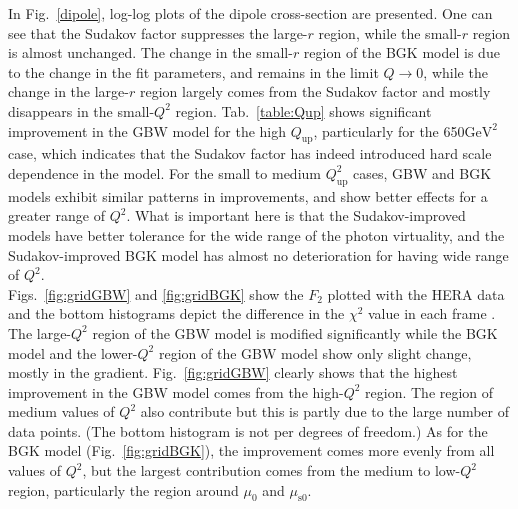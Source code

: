 \documentclass[11pt]{article}
\begin{document}
In Fig.~\ref{dipole}, log-log plots of the dipole cross-section are presented. One can see that the Sudakov factor suppresses the large-$r$ region, while the small-$r$ region is almost unchanged. The change in the small-$r$ region of the BGK model is due to the change in the fit parameters, and remains in the limit $Q\rightarrow0$, while the change in the large-$r$ region largely comes from the Sudakov factor and mostly disappears in the small-$Q^2$ region. 
Tab.~\ref{table:Qup} shows significant improvement in the GBW model for the high $Q_{\mathrm{up}}$, particularly for the 650$\mathrm{GeV^2}$ case, which indicates that the Sudakov factor has indeed introduced hard scale dependence in the model. For the small to medium $Q^2_{\mathrm{up}}$ cases, GBW and BGK models exhibit similar patterns in improvements, and show better effects for a greater range of $Q^2$.
What is important here is that the Sudakov-improved models have better tolerance for the wide range of the photon virtuality, and the Sudakov-improved BGK model has almost no deterioration for having wide range of $Q^2$.\\
Figs.~\ref{fig:gridGBW} and \ref{fig:gridBGK} show the $F_2$ plotted with the HERA data and the bottom histograms depict the difference in the $\chi^2$ value in each frame . 
The large-$Q^2$ region of the GBW model is modified significantly while the BGK model and the lower-$Q^2$ region of the GBW model show only slight change, mostly in the gradient. 
Fig.~\ref{fig:gridGBW} clearly shows that the highest improvement in the GBW model comes from the high-$Q^2$ region. The region of medium values of $Q^2$ also contribute but this is partly due to the large number of data points. (The bottom histogram is not per degrees of freedom.) As for the BGK model (Fig.~\ref{fig:gridBGK}), the improvement comes more evenly from all values of  $Q^2$, but the largest contribution comes from the medium to low-$Q^2$ region, particularly the region around $\mu_0$ and $\mu_{\mathrm{s0}}$.
\end{document}
